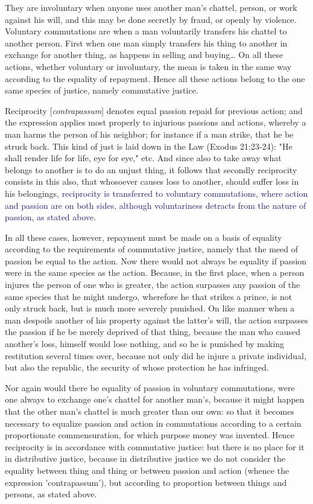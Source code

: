             They are involuntary when anyone uses another man's chattel, person, or work against his will, and this may be done secretly by fraud, or openly by violence. Voluntary commutations are when a man voluntarily transfers his chattel to another person. First when one man simply transfers his thing to another in exchange for another thing, as happens in selling and buying… On all these actions, whether voluntary or involuntary, the mean is taken in the same way according to the equality of repayment. Hence all these actions belong to the one same species of justice, namely commutative justice.

            Reciprocity [\textit{contrapassum}] denotes equal passion repaid for previous action; and the expression applies most properly to injurious passions and actions, whereby a man harms the person of his neighbor; for instance if a man strike, that he be struck back. This kind of just is laid down in the Law (Exodus 21:23-24): "He shall render life for life, eye for eye," etc. And since also to take away what belongs to another is to do an unjust thing, it follows that secondly reciprocity consists in this also, that whosoever causes loss to another, should suffer loss in his belongings, \textcolor{MidnightBlue}{reciprocity is transferred to voluntary commutations, where action and passion are on both sides, although voluntariness detracts from the nature of passion, as stated above.}

            In all these cases, however, repayment must be made on a basis of equality according to the requirements of commutative justice, namely that the meed of passion be equal to the action. Now there would not always be equality if passion were in the same species as the action. Because, in the first place, when a person injures the person of one who is greater, the action surpasses any passion of the same species that he might undergo, wherefore he that strikes a prince, is not only struck back, but is much more severely punished. On like manner when a man despoils another of his property against the latter's will, the action surpasses the passion if he be merely deprived of that thing, because the man who caused another's loss, himself would lose nothing, and so he is punished by making restitution several times over, because not only did he injure a private individual, but also the republic, the security of whose protection he has infringed.

            Nor again would there be equality of passion in voluntary commutations, were one always to exchange one's chattel for another man's, because it might happen that the other man's chattel is much greater than our own: so that it becomes necessary to equalize passion and action in commutations according to a certain proportionate commensuration, for which purpose money was invented. Hence reciprocity is in accordance with commutative justice: but there is no place for it in distributive justice, because in distributive justice we do not consider the equality between thing and thing or between passion and action (whence the expression 'contrapassum'), but according to proportion between things and persons, as stated above.

